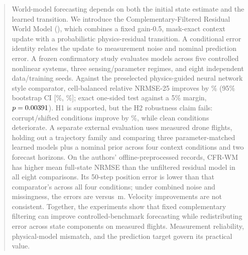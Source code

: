\begin{abstract}
World-model forecasting depends on both the initial state estimate and the
learned transition. We introduce the Complementary-Filtered Residual World
Model (\method), which combines a fixed gain-0.5, mask-exact context update
with a probabilistic physics-residual transition. A conditional error identity
relates the update to measurement noise and nominal prediction error. A frozen
confirmatory study evaluates \ConfirmatoryRuns{} models across five controlled
nonlinear systems, three sensing/parameter regimes, and eight independent
data/training seeds. Against the preselected physics-guided neural network
style comparator, cell-balanced relative NRMSE-25 improves by
\PrimaryImprovement\% (95\% bootstrap CI
[\PrimaryRelativeCILow\%, \PrimaryRelativeCIHigh\%]; exact one-sided test
against a 5\% margin, $p=\PrimaryPValue$). H1 is supported, but the H2
robustness claim fails: corrupt/shifted conditions improve by
\CorruptImprovement\%, while clean conditions deteriorate.
A separate external evaluation uses measured drone flights, holding out a
trajectory family and comparing three parameter-matched learned models plus
a nominal prior across four context conditions and two forecast horizons.
On the authors' offline-preprocessed records, CFR-WM has higher mean full-state
NRMSE than the unfiltered residual model in all eight comparisons. Its
50-step position error is lower than that comparator's across all four
conditions; under combined noise and missingness, the errors are
\ExternalCFRCombinedLongPositionMean{} versus
\ExternalUnfilteredCombinedLongPositionMean{}\,m. Velocity improvements are
not consistent. Together, the experiments show that fixed complementary
filtering can improve controlled-benchmark forecasting while redistributing
error across state components on measured flights. Measurement reliability,
physical-model mismatch, and the prediction target govern its practical value.
\end{abstract}
